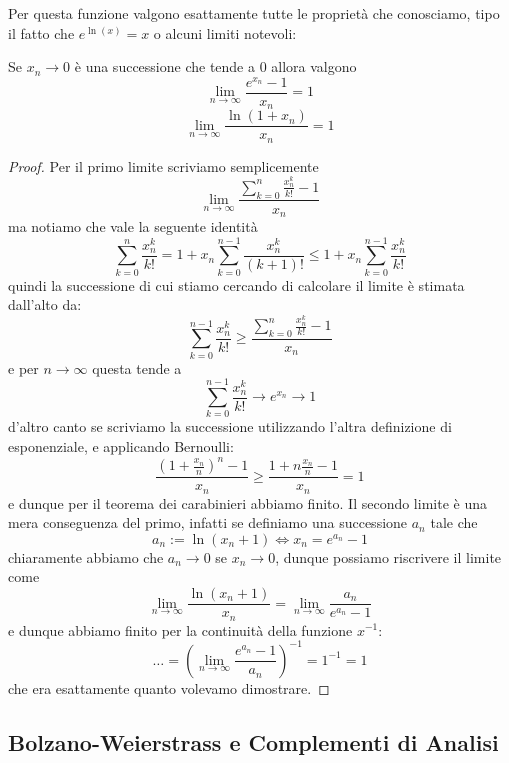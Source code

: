 \documentclass[11pt]{scrartcl}
\begin{document}
	Per questa funzione valgono esattamente tutte le proprietà che conosciamo, tipo il fatto che $e^{\ln(x)}=x$ o alcuni limiti notevoli:
	\begin{lemma}
		Se $x_n\to 0$ è una successione che tende a $0$ allora valgono
		$$\lim_{n\to\infty}\frac{e^{x_n}-1}{x_n}=1$$
		$$\lim_{n\to\infty}\frac{\ln(1+x_n)}{x_n}=1$$
	\end{lemma}
	\begin{proof}
		Per il primo limite scriviamo semplicemente
		$$\lim_{n\to\infty}\frac{\sum_{k=0}^n \frac{x_n^k}{k!}-1}{x_n}$$
		ma notiamo che vale la seguente identità
		$$\sum_{k=0}^n\frac{x_n^k}{k!}=1+x_n\sum_{k=0}^{n-1}\frac{x_n^k}{(k+1)!}\le 1+x_n\sum_{k=0}^{n-1}\frac{x_n^k}{k!}$$
		quindi la successione di cui stiamo cercando di calcolare il limite è stimata dall'alto da:
		$$\sum_{k=0}^{n-1}\frac{x_n^k}{k!}\ge \frac{\sum_{k=0}^n \frac{x_n^k}{k!}-1}{x_n}$$
		e per $n\to\infty$ questa tende a 
		$$\sum_{k=0}^{n-1}\frac{x_n^k}{k!}\to e^{x_n}\to 1$$
		d'altro canto se scriviamo la successione utilizzando l'altra definizione di esponenziale, e applicando Bernoulli:
		$$\frac{\left(1+\frac{x_n}{n}\right)^n-1}{x_n}\ge \frac{1+n\frac{x_n}{n}-1}{x_n}=1$$
		e dunque per il teorema dei carabinieri abbiamo finito. Il secondo limite è una mera conseguenza del primo, infatti se definiamo una successione $a_n$ tale che
		$$a_n:=\ln(x_n+1) \iff x_n=e^{a_n}-1$$
		chiaramente abbiamo che $a_n\to 0$ se $x_n\to 0$, dunque possiamo riscrivere il limite come
		$$\lim_{n\to \infty}\frac{\ln(x_n+1)}{x_n}=\lim_{n\to \infty}\frac{a_n}{e^{a_n}-1}$$
		e dunque abbiamo finito per la continuità della funzione $x^{-1}$:
		$$\dots=\left(\lim_{n\to\infty}\frac{e^{a_n}-1}{a_n}\right)^{-1}=1^{-1}=1$$
		che era esattamente quanto volevamo dimostrare.
	\end{proof}
	
	\subsection{Bolzano-Weierstrass e Complementi di Analisi}
	
\end{document}
